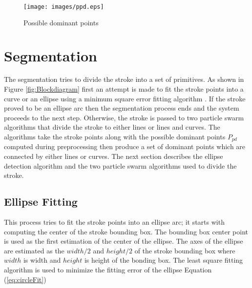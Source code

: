 \begin{figure}
	\centering
		\texttt{[image: images/ppd.eps]}
	\caption{Possible dominant points}%
	\label{fig:LabelsPPD}
\end{figure}

\section{Segmentation}
\label{sec:Segmentation}
The segmentation tries to divide the stroke into a set of primitives. As shown in Figure \ref{fig:Blockdiagram} first an attempt is made to fit the stroke points into a curve or an ellipse using a minimum square error fitting algorithm \cite{chernov-2003}. If the stroke proved to be an ellipse arc then the segmentation process ends and the system proceeds to the next step. Otherwise, the stroke is passed to two particle swarm algorithms that divide the stroke to either lines or lines and curves. The algorithms take the stroke points along with the possible dominant points $P_{pd}$ computed during preprocessing then produce a set of dominant points which are connected by either lines or curves. The next section describes the ellipse detection algorithm and the two particle swarm algorithms used to divide the stroke.


\subsection{Ellipse Fitting }
\label{sec:EllipseDetection}

This process tries to fit the stroke points into an ellipse arc; it starts with computing the center of the stroke bounding box. The bounding box center point is used as the first estimation of the center of the ellipse. The axes of the ellipse are estimated as the $width/2$ and $height/2$ of the stroke bounding box where $width$ is width and $height$ is height of the bonding box. The least square fitting algorithm \cite{chernov-2003} is used to minimize the fitting error of the ellipse Equation (\ref{eq:circleFit})  

